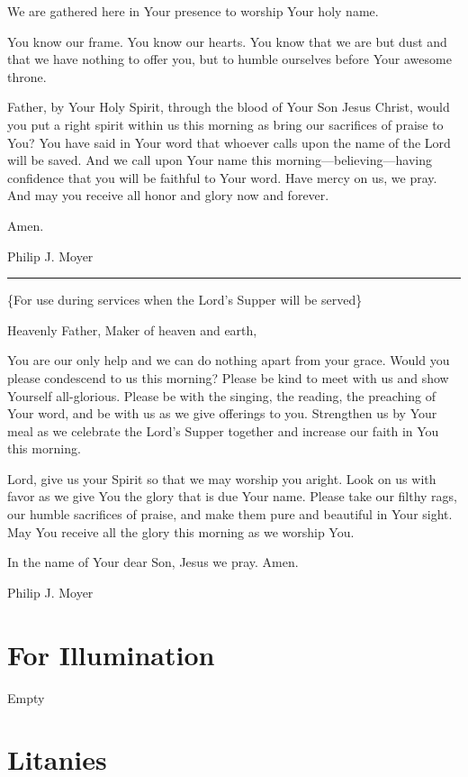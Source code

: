\documentclass[]{book}
\begin{document}
We are gathered here in Your presence to worship Your holy name.

You know our frame. You know our hearts. You know that we are but dust
and that we have nothing to offer you, but to humble ourselves before
Your awesome throne.

Father, by Your Holy Spirit, through the blood of Your Son Jesus Christ,
would you put a right spirit within us this morning as bring our
sacrifices of praise to You? You have said in Your word that whoever
calls upon the name of the Lord will be saved. And we call upon Your
name this morning---believing---having confidence that you will be
faithful to Your word. Have mercy on us, we pray. And may you receive
all honor and glory now and forever.

Amen.

Philip J. Moyer

\begin{center}\rule{0.5\linewidth}{\linethickness}\end{center}

\{For use during services when the Lord's Supper will be served\}

Heavenly Father, Maker of heaven and earth,

You are our only help and we can do nothing apart from your grace. Would
you please condescend to us this morning? Please be kind to meet with us
and show Yourself all-glorious. Please be with the singing, the reading,
the preaching of Your word, and be with us as we give offerings to you.
Strengthen us by Your meal as we celebrate the Lord's Supper together
and increase our faith in You this morning.

Lord, give us your Spirit so that we may worship you aright. Look on us
with favor as we give You the glory that is due Your name. Please take
our filthy rags, our humble sacrifices of praise, and make them pure and
beautiful in Your sight. May You receive all the glory this morning as
we worship You.

In the name of Your dear Son, Jesus we pray. Amen.

Philip J. Moyer

\section{For Illumination}\label{for-illumination}

Empty

\section{Litanies}\label{litanies}
\end{document}
